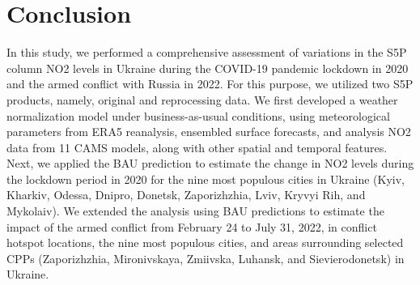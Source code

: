 \section{Conclusion} \label{chap3_conclusion}
In this study, we performed a comprehensive assessment of variations in the S5P column NO2 levels in Ukraine during the COVID-19 pandemic lockdown in 2020 and the armed conflict with Russia in 2022. For this purpose, we utilized two S5P products, namely, original and reprocessing data. We first developed a weather normalization model under business-as-usual conditions, using meteorological parameters from ERA5 reanalysis, ensembled surface forecasts, and analysis NO2 data from 11 CAMS models, along with other spatial and temporal features. Next, we applied the BAU prediction to estimate the change in NO2 levels during the lockdown period in 2020 for the nine most populous cities in Ukraine (Kyiv, Kharkiv, Odessa, Dnipro, Donetsk, Zaporizhzhia, Lviv, Kryvyi Rih, and Mykolaiv). We extended the analysis using BAU predictions to estimate the impact of the armed conflict from February 24 to July 31, 2022, in conflict hotspot locations, the nine most populous cities, and areas surrounding selected CPPs (Zaporizhzhia, Mironivskaya, Zmiivska, Luhansk, and Sievierodonetsk) in Ukraine.\par

